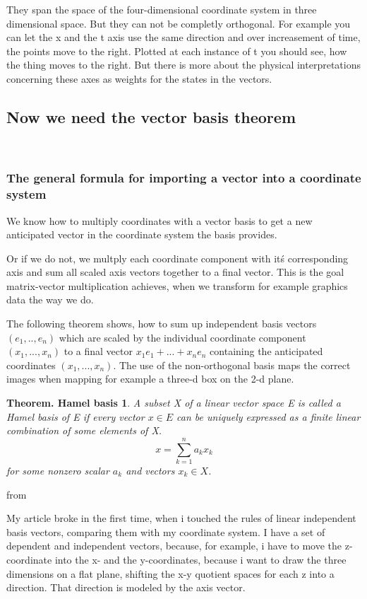 \documentclass[a4paper]{article}
\begin{document}
They span the space of the four-dimensional coordinate system in three dimensional space. But they can not be completly orthogonal. For example you can let the x and the t axis use the same direction and over increasement of time, the points move to the right. Plotted at each instance of t you should see, how the thing moves to the right. But there is more about the physical interpretations concerning these axes as weights for the states in the vectors.


\subsection{Now we need the vector basis theorem}\\

\subsubsection{The general formula for importing a vector into a coordinate system}

We know how to multiply coordinates with a vector basis to get a new anticipated vector in the coordinate system the basis provides.

Or if we do not, we multply each coordinate component with it\'s corresponding axis and sum all scaled axis vectors together to a final vector. This is the goal matrix-vector multiplication achieves, when we transform for example graphics data the way we do.

The following theorem shows, how to sum up independent basis vectors  $(e_1, .., e_n)$ which are scaled by the individual coordinate component $(x_1, ..., x_n)$ to a final vector $x_1 e_1 + ... + x_n e_n$ containing the anticipated coordinates $(x_1, ..., x_n)$. 
The use of the non-orthogonal basis maps the correct images when mapping for example a three-d box on the 2-d plane.

\newtheorem{Vectorbasis}{Theorem. Hamel basis}
\begin{Vectorbasis}
A subset X of a linear vector space E is called a Hamel basis of E if every vector $x \in E$ can be uniquely expressed as a finite linear combination of some elements of X.
\begin{displaymath}
x=\sum_{k=1}^{n}a_{k}x_{k}
\end{displaymath}
for some nonzero scalar $a_{k}$ and vectors $x_{k} \in X$.
\end{Vectorbasis}
from \cite{Vershynin1}

My article broke in the first time, when i touched the rules of linear independent basis vectors, comparing them with my coordinate system. I have a set of dependent and independent vectors, because, for example, i have to move the z-coordinate into the x- and the y-coordinates, because i want to draw the three dimensions on a flat plane, shifting the x-y quotient spaces for each z into a direction. That direction is modeled by the axis vector.
\end{document}
